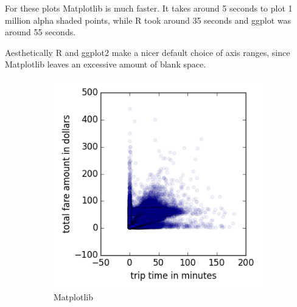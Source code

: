 \documentclass[]{article}
\begin{document}
For these plots Matplotlib is much faster. It takes around 5 seconds to
plot 1 million alpha shaded points, while R took around 35 seconds and
ggplot was around 55 seconds.

Aesthetically R and ggplot2 make a nicer default choice of axis ranges,
since Matplotlib leaves an excessive amount of blank space.

\begin{figure}
        \centering
        \begin{subfigure}[b]{0.3\textwidth}
                \includegraphics[width=\textwidth]{matplotlib/alpha.png}
                \caption{Matplotlib}
        \end{subfigure}%
        ~ %
        \begin{subfigure}[b]{0.3\textwidth}

\end{subfigure}
\end{figure}
\end{document}
